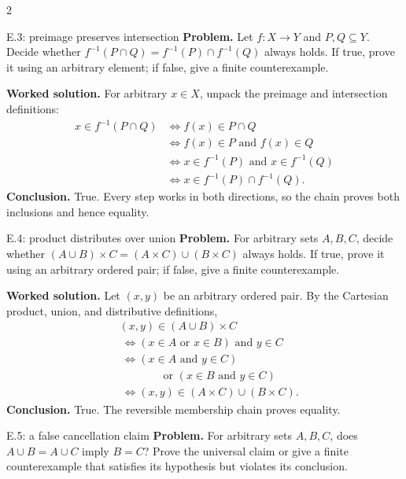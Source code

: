 \documentclass[10pt]{article}
\begin{document}
\begin{multicols}{2}
\begin{workedbox}{E.3: preimage preserves intersection}
\textbf{Problem.} Let $f:X\to Y$ and $P,Q\subseteq Y$. Decide whether
$f^{-1}(P\cap Q)=f^{-1}(P)\cap f^{-1}(Q)$ always holds. If true, prove it
using an arbitrary element; if false, give a finite counterexample.

\textbf{Worked solution.} For arbitrary $x\in X$, unpack the preimage and
intersection definitions:
\begin{align*}
x\in f^{-1}(P\cap Q)
&\Longleftrightarrow f(x)\in P\cap Q\\
&\Longleftrightarrow f(x)\in P\text{ and }f(x)\in Q\\
&\Longleftrightarrow x\in f^{-1}(P)\text{ and }x\in f^{-1}(Q)\\
&\Longleftrightarrow x\in f^{-1}(P)\cap f^{-1}(Q).
\end{align*}
\textbf{Conclusion.} True. Every step works in both directions, so the chain
proves both inclusions and hence equality.
\end{workedbox}

\begin{workedbox}{E.4: product distributes over union}
\textbf{Problem.} For arbitrary sets $A,B,C$, decide whether
$(A\cup B)\times C=(A\times C)\cup(B\times C)$ always holds. If true,
prove it using an arbitrary ordered pair; if false, give a finite counterexample.

\textbf{Worked solution.} Let $(x,y)$ be an arbitrary ordered pair. By the
Cartesian product, union, and distributive definitions,
\begin{align*}
&(x,y)\in(A\cup B)\times C\\
&\ \Longleftrightarrow (x\in A\text{ or }x\in B)\text{ and }y\in C\\
&\ \Longleftrightarrow (x\in A\text{ and }y\in C)\\
&\hspace{4em}\text{or }(x\in B\text{ and }y\in C)\\
&\ \Longleftrightarrow (x,y)\in(A\times C)\cup(B\times C).
\end{align*}
\textbf{Conclusion.} True. The reversible membership chain proves equality.
\end{workedbox}

\begin{workedbox}{E.5: a false cancellation claim}
\textbf{Problem.} For arbitrary sets $A,B,C$, does
$A\cup B=A\cup C$ imply $B=C$? Prove the universal claim or give a finite
counterexample that satisfies its hypothesis but violates its conclusion.


\end{workedbox}
\end{multicols}
\end{document}
